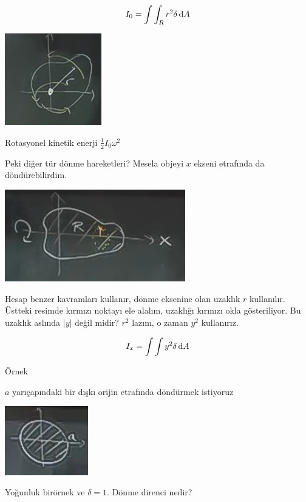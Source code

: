 \documentclass[12pt,fleqn]{article}\usepackage{../../common}
\begin{document}
$$ I_0 = \int \int_R r^2 \delta \,\mathrm{d} A $$

\begin{center}
\includegraphics[height=4cm]{17_5.png}
\end{center}

Rotasyonel kinetik enerji $\frac{1}{2}I_0 \omega^2$

Peki diğer tür dönme hareketleri? Mesela objeyi $x$ ekseni etrafında da
döndürebilirdim. 

\begin{center}
\includegraphics[height=4cm]{17_6.png}
\end{center}

Hesap benzer kavramları kullanır, dönme eksenine olan uzaklık $r$
kullanılır. Üstteki resimde kırmızı noktayı ele alalım, uzaklığı kırmızı okla
gösteriliyor. Bu uzaklık aslında $|y|$ değil midir? $r^2$ lazım, o zaman $y^2$
kullanırız.

$$ I_x = \int \int y^2 \delta \,\mathrm{d} A $$

Örnek

$a$ yarıçapındaki bir dışkı orijin etrafında döndürmek istiyoruz 

\begin{center}
\includegraphics[height=3cm]{17_7.png}
\end{center}

Yoğunluk birörnek ve $\delta = 1$. Dönme direnci nedir? 
\end{document}
